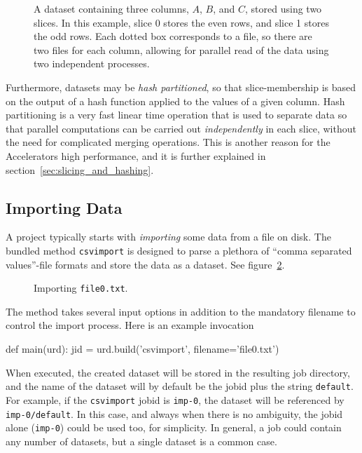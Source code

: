 \begin{figure}[h!]
  \begin{center}
    
    \caption{A dataset containing three columns, $A$, $B$, and $C$,
      stored using two slices.  In this example, slice 0 stores the
      even rows, and slice 1 stores the odd rows.  Each dotted box
      corresponds to a file, so there are two files for each column,
      allowing for parallel read of the data using two independent
      processes.}
    \label{fig:dataset}
  \end{center}
\end{figure}

Furthermore, datasets may be \textsl{hash partitioned}, so that
slice-membership is based on the output of a hash function applied to
the values of a given column.  Hash partitioning is a very fast linear
time operation that is used to separate data so that parallel
computations can be carried out \emph{independently} in each slice,
without the need for complicated merging operations.  This is another
reason for the Accelerators high performance, and it is further
explained in section~\ref{sec:slicing_and_hashing}.



\subsection{Importing Data}

A project typically starts with \textsl{importing} some data from a
file on disk.  The bundled method \texttt{csvimport} is designed to
parse a plethora of ``comma separated values''-file formats and store
the data as a dataset.  See figure~\ref{fig:dataset_csvimport}.
\begin{figure}[b]
  \begin{center}
    
    \caption{Importing \texttt{file0.txt}.}
    \label{fig:dataset_csvimport}
  \end{center}
\end{figure}
The method takes several input options in addition to the mandatory
filename to control the import process.  Here is an example
invocation
\begin{python}
def main(urd):
    jid = urd.build('csvimport', filename='file0.txt')
\end{python}
When executed, the created dataset will be stored in the resulting job
directory, and the name of the dataset will by default be the jobid
plus the string \texttt{default}.  For example, if the
\texttt{csvimport} jobid is \texttt{imp-0}, the dataset will be
referenced by \texttt{imp-0/default}.  In this case, and always when
there is no ambiguity, the jobid alone (\texttt{imp-0}) could be used
too, for simplicity.  In general, a job could contain any number of
datasets, but a single dataset is a common case.




